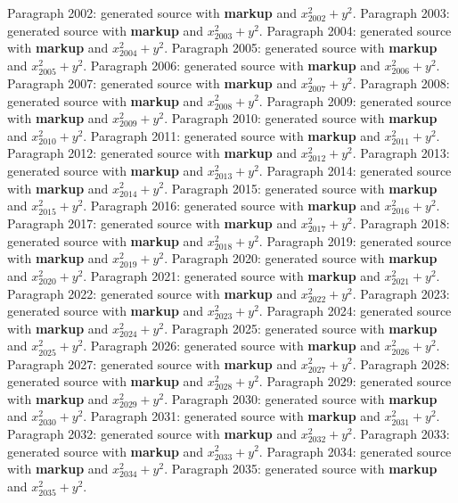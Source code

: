 \documentclass{article}
\begin{document}
Paragraph 2002: generated source with \textbf{markup} and $x_{2002}^2 + y^2$.
Paragraph 2003: generated source with \textbf{markup} and $x_{2003}^2 + y^2$.
Paragraph 2004: generated source with \textbf{markup} and $x_{2004}^2 + y^2$.
Paragraph 2005: generated source with \textbf{markup} and $x_{2005}^2 + y^2$.
Paragraph 2006: generated source with \textbf{markup} and $x_{2006}^2 + y^2$.
Paragraph 2007: generated source with \textbf{markup} and $x_{2007}^2 + y^2$.
Paragraph 2008: generated source with \textbf{markup} and $x_{2008}^2 + y^2$.
Paragraph 2009: generated source with \textbf{markup} and $x_{2009}^2 + y^2$.
Paragraph 2010: generated source with \textbf{markup} and $x_{2010}^2 + y^2$.
Paragraph 2011: generated source with \textbf{markup} and $x_{2011}^2 + y^2$.
Paragraph 2012: generated source with \textbf{markup} and $x_{2012}^2 + y^2$.
Paragraph 2013: generated source with \textbf{markup} and $x_{2013}^2 + y^2$.
Paragraph 2014: generated source with \textbf{markup} and $x_{2014}^2 + y^2$.
Paragraph 2015: generated source with \textbf{markup} and $x_{2015}^2 + y^2$.
Paragraph 2016: generated source with \textbf{markup} and $x_{2016}^2 + y^2$.
Paragraph 2017: generated source with \textbf{markup} and $x_{2017}^2 + y^2$.
Paragraph 2018: generated source with \textbf{markup} and $x_{2018}^2 + y^2$.
Paragraph 2019: generated source with \textbf{markup} and $x_{2019}^2 + y^2$.
Paragraph 2020: generated source with \textbf{markup} and $x_{2020}^2 + y^2$.
Paragraph 2021: generated source with \textbf{markup} and $x_{2021}^2 + y^2$.
Paragraph 2022: generated source with \textbf{markup} and $x_{2022}^2 + y^2$.
Paragraph 2023: generated source with \textbf{markup} and $x_{2023}^2 + y^2$.
Paragraph 2024: generated source with \textbf{markup} and $x_{2024}^2 + y^2$.
Paragraph 2025: generated source with \textbf{markup} and $x_{2025}^2 + y^2$.
Paragraph 2026: generated source with \textbf{markup} and $x_{2026}^2 + y^2$.
Paragraph 2027: generated source with \textbf{markup} and $x_{2027}^2 + y^2$.
Paragraph 2028: generated source with \textbf{markup} and $x_{2028}^2 + y^2$.
Paragraph 2029: generated source with \textbf{markup} and $x_{2029}^2 + y^2$.
Paragraph 2030: generated source with \textbf{markup} and $x_{2030}^2 + y^2$.
Paragraph 2031: generated source with \textbf{markup} and $x_{2031}^2 + y^2$.
Paragraph 2032: generated source with \textbf{markup} and $x_{2032}^2 + y^2$.
Paragraph 2033: generated source with \textbf{markup} and $x_{2033}^2 + y^2$.
Paragraph 2034: generated source with \textbf{markup} and $x_{2034}^2 + y^2$.
Paragraph 2035: generated source with \textbf{markup} and $x_{2035}^2 + y^2$.
\end{document}
